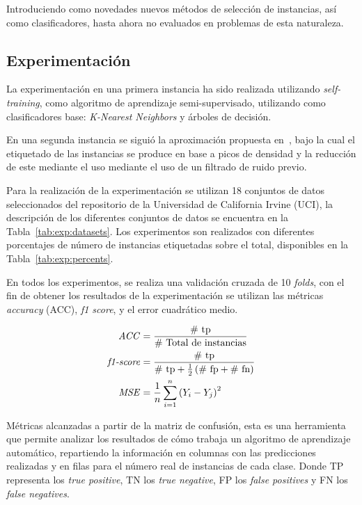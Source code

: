 Introduciendo como novedades nuevos métodos de selección de instancias, así como clasificadores, hasta ahora no evaluados en problemas de esta naturaleza.

\subsection{Experimentación}
La experimentación en una primera instancia ha sido realizada utilizando \textit{self-training}, como algoritmo de aprendizaje semi-supervisado, utilizando como clasificadores base: \textit{K-Nearest Neighbors} y árboles de decisión. 

En una segunda instancia se siguió la aproximación propuesta en~\cite{li2019selfk}, bajo la cual el etiquetado de las instancias se produce en base a picos de densidad y la reducción de este mediante el uso mediante el uso de un filtrado de ruido previo.

Para la realización de la experimentación se utilizan 18 conjuntos de datos seleccionados del repositorio de la Universidad de California Irvine (UCI), la descripción de los diferentes conjuntos de datos se encuentra en la Tabla~\ref{tab:exp:datasets}. Los experimentos son realizados con diferentes porcentajes de número de instancias etiquetadas sobre el total, disponibles en la Tabla~\ref{tab:exp:percents}.

En todos los experimentos, se realiza una validación cruzada de 10 \textit{folds}, con el fin de obtener los resultados de la experimentación se utilizan las métricas \textit{accuracy} (ACC), \textit{f1 score}, y el error cuadrático medio.

\begin{align}
\text{\textit{ACC}} & = \frac{\text{\# tp}}{\text{\# Total de instancias}} \\
\text{\textit{f1-score}} & = \frac{\text{\# tp}}{\text{\# tp} + \frac{1}{2}\left( \text{\# fp} + \text{\# fn}\right)} \\
\text{\textit{MSE}} & = \frac{1}{n} \sum_{i=1}^{n}\left(Y_i - Y_j\right)^2
\end{align}

\noindent Métricas alcanzadas a partir de la matriz de confusión, esta es una herramienta que permite analizar los resultados de cómo trabaja un algoritmo de aprendizaje automático, repartiendo la información en columnas con las predicciones realizadas y en filas para el número real de instancias de cada clase. 
Donde TP representa los \textit{true positive}, TN los \textit{true negative}, FP los \textit{false positives} y FN los \textit{false negatives}. 

